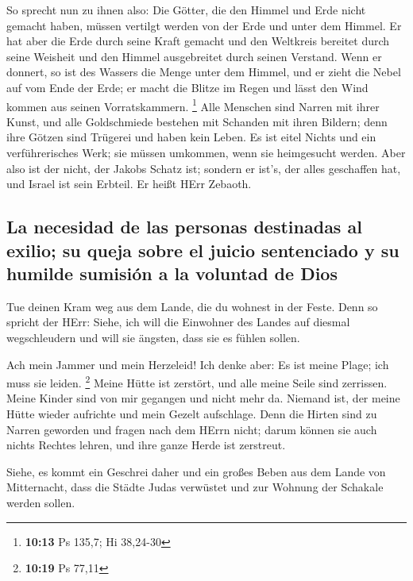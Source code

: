  So sprecht nun zu ihnen also: Die Götter, die den Himmel
und Erde nicht gemacht haben, müssen vertilgt werden von der Erde und
unter dem Himmel.  Er hat aber die Erde durch seine Kraft
gemacht und den Weltkreis bereitet durch seine Weisheit und den Himmel
ausgebreitet durch seinen Verstand.  Wenn er donnert, so
ist des Wassers die Menge unter dem Himmel, und er zieht die Nebel auf
vom Ende der Erde; er macht die Blitze im Regen und lässt den Wind
kommen aus seinen Vorratskammern. \footnote{\textbf{10:13} Ps 135,7; Hi
  38,24-30}  Alle Menschen sind Narren mit ihrer Kunst,
und alle Goldschmiede bestehen mit Schanden mit ihren Bildern; denn ihre
Götzen sind Trügerei und haben kein Leben.  Es ist eitel
Nichts und ein verführerisches Werk; sie müssen umkommen, wenn sie
heimgesucht werden.  Aber also ist der nicht, der Jakobs
Schatz ist; sondern er ist's, der alles geschaffen hat, und Israel ist
sein Erbteil. Er heißt HErr Zebaoth.

\hypertarget{la-necesidad-de-las-personas-destinadas-al-exilio-su-queja-sobre-el-juicio-sentenciado-y-su-humilde-sumisiuxf3n-a-la-voluntad-de-dios}{%
\subsection{La necesidad de las personas destinadas al exilio; su queja
sobre el juicio sentenciado y su humilde sumisión a la voluntad de
Dios}\label{la-necesidad-de-las-personas-destinadas-al-exilio-su-queja-sobre-el-juicio-sentenciado-y-su-humilde-sumisiuxf3n-a-la-voluntad-de-dios}}

 Tue deinen Kram weg aus dem Lande, die du wohnest in der
Feste.  Denn so spricht der HErr: Siehe, ich will die
Einwohner des Landes auf diesmal wegschleudern und will sie ängsten,
dass sie es fühlen sollen.

 Ach mein Jammer und mein Herzeleid! Ich denke aber: Es
ist meine Plage; ich muss sie leiden. \footnote{\textbf{10:19} Ps 77,11}
 Meine Hütte ist zerstört, und alle meine Seile sind
zerrissen. Meine Kinder sind von mir gegangen und nicht mehr da. Niemand
ist, der meine Hütte wieder aufrichte und mein Gezelt aufschlage.
 Denn die Hirten sind zu Narren geworden und fragen nach
dem HErrn nicht; darum können sie auch nichts Rechtes lehren, und ihre
ganze Herde ist zerstreut.

 Siehe, es kommt ein Geschrei daher und ein großes Beben
aus dem Lande von Mitternacht, dass die Städte Judas verwüstet und zur
Wohnung der Schakale werden sollen.

